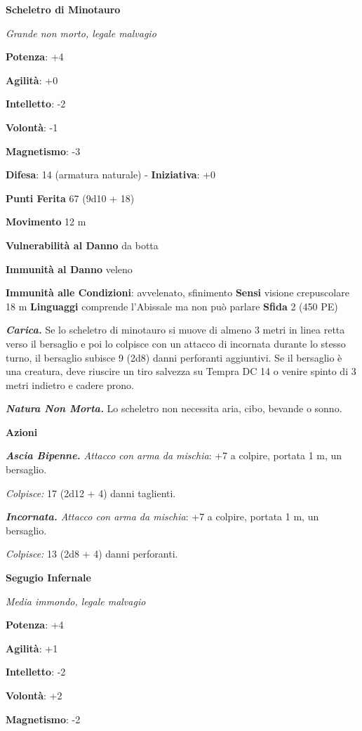 \begin{multicols}{2}
\textbf{Scheletro di Minotauro}

\emph{Grande non morto, legale malvagio}

\textbf{Potenza}: +4

\textbf{Agilità}: +0

\textbf{Intelletto}: -2

\textbf{Volontà}: -1

\textbf{Magnetismo}: -3

\textbf{Difesa}: 14 (armatura naturale) - \textbf{Iniziativa}: +0

\textbf{Punti Ferita} 67 (9d10 + 18)

\textbf{Movimento} 12 m

\textbf{Vulnerabilità al Danno} da botta

\textbf{Immunità al Danno} veleno

\textbf{Immunità alle Condizioni}: avvelenato, sfinimento \textbf{Sensi}
visione crepuscolare 18 m \textbf{Linguaggi} comprende
l'Abissale ma non può parlare \textbf{Sfida} 2 (450 PE)\smallskip

\emph{\textbf{Carica.}} Se lo scheletro di minotauro si muove di almeno
3 metri in linea retta verso il bersaglio e poi lo colpisce con un
attacco di incornata durante lo stesso turno, il bersaglio subisce 9
(2d8) danni perforanti aggiuntivi. Se il bersaglio è una creatura, deve
riuscire un tiro salvezza su Tempra DC 14 o venire spinto di 3 metri
indietro e cadere prono.

\emph{\textbf{Natura Non Morta.}} Lo scheletro non necessita aria, cibo,
bevande o sonno.

\smallskip\textbf{Azioni}

\emph{\textbf{Ascia Bipenne.} Attacco con arma da mischia}: +7 a
colpire, portata 1 m, un bersaglio.

\emph{Colpisce:} 17 (2d12 + 4) danni taglienti.

\emph{\textbf{Incornata.} Attacco con arma da mischia}: +7 a colpire,
portata 1 m, un bersaglio.

\emph{Colpisce:} 13 (2d8 + 4) danni perforanti.

\textbf{Segugio Infernale}

\emph{Media immondo, legale malvagio}

\textbf{Potenza}: +4

\textbf{Agilità}: +1

\textbf{Intelletto}: -2

\textbf{Volontà}: +2

\textbf{Magnetismo}: -2


\end{multicols}

